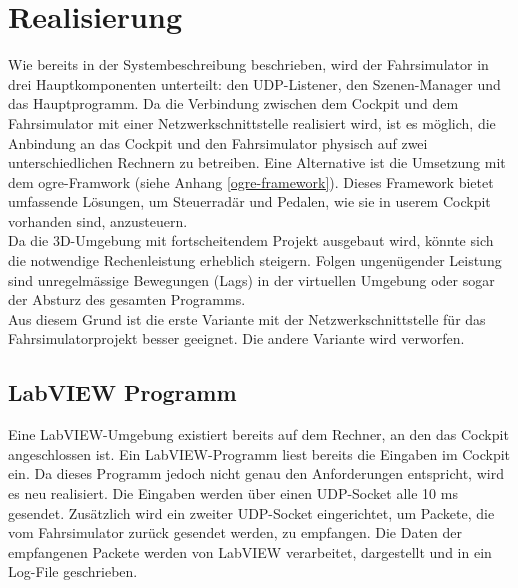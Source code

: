 \section{Realisierung}
Wie bereits in der Systembeschreibung beschrieben, wird der Fahrsimulator in drei Hauptkomponenten unterteilt: den UDP-Listener, den Szenen-Manager und das Hauptprogramm. Da die Verbindung zwischen dem Cockpit und dem Fahrsimulator mit einer Netzwerkschnittstelle realisiert wird, ist es möglich, die Anbindung an das Cockpit und den Fahrsimulator physisch auf zwei unterschiedlichen Rechnern zu betreiben. Eine Alternative ist die Umsetzung mit dem \gls{ogre}-Framwork (siehe Anhang \ref{ogre-framework}). Dieses Framework bietet umfassende Lösungen, um Steuerradär und Pedalen, wie sie in userem Cockpit vorhanden sind, anzusteuern.\\
Da die 3D-Umgebung mit fortscheitendem Projekt ausgebaut wird, könnte sich die notwendige Rechenleistung erheblich steigern. Folgen ungenügender Leistung sind unregelmässige Bewegungen (Lags) in der virtuellen Umgebung oder sogar der Absturz des gesamten Programms.\\
Aus diesem Grund ist die erste Variante mit der Netzwerkschnittstelle für das Fahrsimulatorprojekt besser geeignet. Die andere Variante wird verworfen.

\newpage
\subsection{LabVIEW Programm}
Eine LabVIEW-Umgebung existiert bereits auf dem Rechner, an den das Cockpit angeschlossen ist. Ein LabVIEW-Programm liest bereits die Eingaben im Cockpit ein. Da dieses Programm jedoch nicht genau den Anforderungen entspricht, wird es neu realisiert. Die Eingaben werden über einen UDP-Socket alle 10 ms gesendet. Zusätzlich wird ein zweiter UDP-Socket eingerichtet, um Packete, die vom Fahrsimulator zurück gesendet werden, zu empfangen. Die Daten der empfangenen Packete werden von LabVIEW verarbeitet, dargestellt und in ein Log-File geschrieben.

